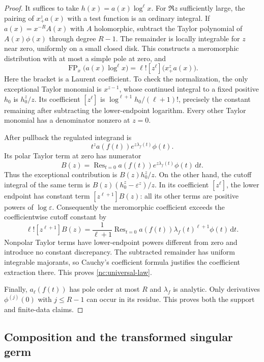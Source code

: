 \documentclass[11pt,a4paper]{article}
\numberwithin{equation}{section}
\theoremstyle{definition}
\theoremstyle{remark}
\DeclareMathOperator{\FP}{FP}
\DeclareMathOperator{\Res}{Res}
\newcommand{\dd}{\,\mathrm d}
\newcommand{\eps}{\varepsilon}
\begin{document}
\begin{proof}
It suffices to take $h(x)=a(x)\log^\ell x$. For $\Re z$ sufficiently
large, the pairing of $x_+^za(x)$ with a test function is an ordinary
integral. If $a(x)=x^{-R}A(x)$ with $A$ holomorphic, subtract the Taylor
polynomial of $A(x)\phi(x)$ through degree $R-1$. The remainder is
locally integrable for $z$ near zero, uniformly on a small closed disk.
This constructs a meromorphic distribution with at most a simple pole
at zero, and
\begin{equation}\label{nc:regulator-fp}
 \FP_x\bigl(a(x)\log^\ell x\bigr)
       =\ell![z^\ell]\bigl(x_+^za(x)\bigr).
\end{equation}
Here the bracket is a Laurent coefficient. To check the normalization,
the only exceptional Taylor monomial is $x^{z-1}$, whose continued
integral to a fixed positive $h_0$ is $h_0^z/z$. Its coefficient
$[z^\ell]$ is $\log^{\ell+1}h_0/(\ell+1)!$, precisely the constant
remaining after subtracting the lower-endpoint logarithm. Every other
Taylor monomial has a denominator nonzero at $z=0$.

After pullback the regulated integrand is
\[
 t^z a(f(t))e^{z\lambda_f(t)}\phi(t).
\]
Its polar Taylor term at zero has numerator
\begin{equation}\label{nc:Bregulator}
 B(z)=\Res_{t=0}a(f(t))e^{z\lambda_f(t)}\phi(t)\dd t.
\end{equation}
Thus the exceptional contribution is $B(z)h_0^z/z$. On the other
hand, the cutoff integral of the same term is
$B(z)(h_0^z-\eps^z)/z$. In its coefficient $[z^\ell]$, the lower
endpoint has constant term $[z^{\ell+1}]B(z)$: all its other terms
are positive powers of $\log\eps$. Consequently the meromorphic
coefficient exceeds the coefficientwise cutoff constant by
\[
 \ell![z^{\ell+1}]B(z)
   =\frac1{\ell+1}\Res_{t=0}
      a(f(t))\lambda_f(t)^{\ell+1}\phi(t)\dd t.
\]
Nonpolar Taylor terms have lower-endpoint powers different from zero
and introduce no constant discrepancy. The subtracted remainder has
uniform integrable majorants, so Cauchy's coefficient formula justifies
the coefficient extraction there. This proves
\eqref{nc:universal-law}.

Finally, $a_\ell(f(t))$ has pole order at most $R$ and $\lambda_f$ is
analytic. Only derivatives $\phi^{(j)}(0)$ with $j\leq R-1$ can occur
in its residue. This proves both the support and finite-data claims.
\end{proof}

\subsection{Composition and the transformed singular germ}
\end{document}
